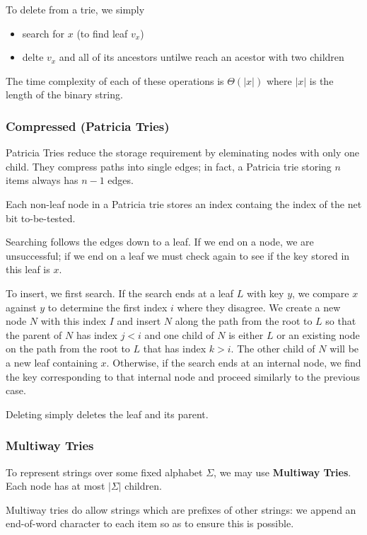 \documentclass[12pt]{article}
\begin{document}
To delete from a trie, we simply
\begin{itemize}
\item search for $x$ (to find leaf $v_x$)
\item delte $v_x$ and all of its ancestors untilwe reach an acestor with two children
\end{itemize}

The time complexity of each of these operations is $\Theta(|x|)$ where $|x|$ is the length of the binary string.

\subsubsection{Compressed (Patricia Tries)}
Patricia Tries reduce the storage requirement by eleminating nodes with only one child. They compress paths into single edges; in fact, a Patricia trie storing $n$ items always has $n-1$ edges.

Each non-leaf node in a Patricia trie stores an index containg the index of the net bit to-be-tested.

Searching follows the edges down to a leaf. If we end on a node, we are unsuccessful; if we end on a leaf we must check again to see if the key stored in this leaf is $x$.

To insert, we first search. If the search ends at a leaf $L$ with key $y$, we compare $x$ against $y$ to determine the first index $i$ where they disagree. We create a new node $N$ with this index $I$ and insert $N$ along the path from the root to $L$ so that the parent of $N$ has index $j < i$ and one child of $N$ is either $L$ or an existing node on the path from the root to $L$ that has index $k > i$. The other child of $N$ will be a new leaf containing $x$. Otherwise, if the search ends at an internal node, we find the key corresponding to that internal node and proceed similarly to the previous case.

Deleting simply deletes the leaf and its parent.

\subsubsection{Multiway Tries}
To represent strings over some fixed alphabet $\Sigma$, we may use {\bf Multiway Tries}. Each node has at most $|\Sigma|$ children.

Multiway tries do allow strings which are prefixes of other strings: we append an end-of-word character to each item so as to ensure this is possible.
\end{document}
